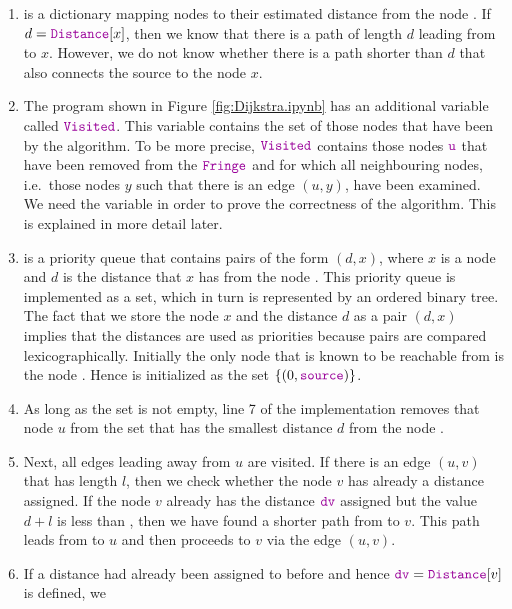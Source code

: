 \begin{enumerate}
\item {} is a dictionary mapping nodes to their estimated distance from the node
      .  If $d = \mytt{Distance}[x]$, then we know that there is a path of length $d$ leading
      from  to $x$.  However, we do not know whether there is a path shorter
      than $d$ that also connects the source to the node $x$.
\item The program shown in Figure \ref{fig:Dijkstra.ipynb} has an additional variable called $\mytt{Visited}$.
      This variable contains the set of those nodes that have been   by the algorithm.
      To be more precise, $\mytt{Visited}$ contains those nodes $\mytt{u}$ that have been removed from the
      $\mytt{Fringe}$ and for which all neighbouring nodes, i.e.~those nodes $y$ such that
      there is an edge $(u,y)$, have been examined.  We need the variable  in order to prove
      the correctness of the algorithm.  This is explained in more detail later.
\item {} is a priority queue that contains pairs of the form $(d, x)$, where $x$ is a node and $d$
      is the distance that $x$ has from the node .  This priority queue is implemented as a set,
      which in turn is represented by an ordered binary tree.  The fact that we store the node $x$ and the
      distance $d$ as a pair $(d,x)$ implies that the distances are used as priorities because pairs are
      compared lexicographically.
      Initially the only node that is known to be
      reachable from  is the node .  Hence  is initialized as the
      set $\{ (0, \mytt{source}) \}$.
\item As long as the set  is not empty, line 7 of the implementation removes that node $u$
      from the set  that has the smallest distance $d$ from the node .
\item Next, all edges leading away from $u$ are visited.  If there is an edge $(u, v)$ that has length $l$,
      then we check whether the node $v$ has already a distance assigned.  If the node $v$ already has the
      distance $\mytt{dv}$ assigned but the value $d + l$ is less than , then we have found a
      shorter path from  to $v$.  This path leads from  to $u$ and then proceeds
      to $v$ via the edge $(u,v)$.
\item If a distance had already been assigned to  before and hence $\mytt{dv}=\mytt{Distance}[v]$ is defined, we

\end{enumerate}
